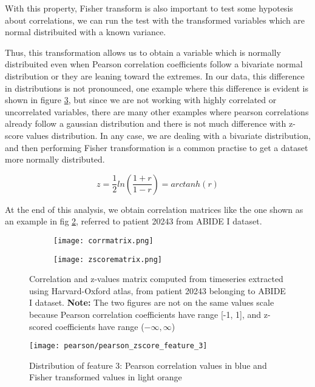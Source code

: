 \documentclass[11pt]{report}
\begin{document}
With this property, Fisher transform is also important to test some hypotesis about correlations, we can run the test with the transformed variables which are normal distribuited with a known variance.

Thus, this transformation allows us to obtain a variable which is normally distribuited even when Pearson correlation coefficients follow a bivariate normal distribution or they are leaning toward the extremes.
In our data, this difference in distributions is not pronounced, one example where this difference is evident is shown in figure \ref{fig:pearson_zscore_distribution_3}, but since we are not working with highly correlated or uncorrelated variables, there are many other examples where pearson correlations already follow a gaussian distribution and there is not much difference with z-score values distribution.
In any case, we are dealing with a bivariate distribution, and then performing Fisher transformation is a common practise to get a dataset more normally distributed.

\begin{equation}
z = \frac{1}{2}ln\left(\frac{1+r}{1-r}\right) = arctanh(r)
\end{equation}

At the end of this analysis, we obtain correlation matrices like the one shown as an example in fig \ref{fig:corrmatrices}, referred to patient 20243 from ABIDE I dataset.
\begin{figure}
\begin{subfigure}{0.5\textwidth}
\texttt{[image: corrmatrix.png]}
\caption{}
\label{ref:corrmatrix}
\end{subfigure}
\begin{subfigure}{0.5\textwidth}
\texttt{[image: zscorematrix.png]}
\end{subfigure}
\caption{Correlation and z-values matrix computed from timeseries extracted using Harvard-Oxford atlas, from patient 20243 belonging to ABIDE I dataset. \textbf{Note:} The two figures are not on the same values scale because Pearson correlation coefficients have range [-1, 1], and z-scored coefficients have range ($-\infty,\infty$)}
\label{fig:corrmatrices}
\end{figure}


\begin{figure}[h!]
\centering
\texttt{[image: pearson/pearson\_zscore\_feature\_3]}
\caption{Distribution of feature 3: Pearson correlation values in blue and Fisher transformed values in light orange}
\label{fig:pearson_zscore_distribution_3}
\end{figure}
\end{document}
